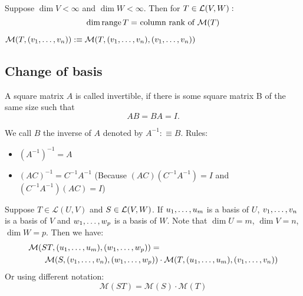   \setcounter{thm}{77}
  \begin{thm} 
    Suppose $\dim V < \infty$ and $\dim W < \infty$. Then for $T \in \mathcal{L}(V,W):$
    \begin{equation}
      \dim \myrange T = $ column rank of $ \mmatrix (T)
    \end{equation}
  \begin{mydef-non}
  $\mathcal{M}(T, (v_1, \dots, v_n)) :\equiv \mathcal{M}(T, (v_1, \dots, v_n),(v_1, \dots, v_n))$
\end{mydef-non}
  \end{thm}

  \subsection{Change of basis}


  \setcounter{thm}{79}
  \begin{mydef}
    A square matrix $A$ is called invertible, if there is some square matrix B of the same size such that
    \begin{equation}
    	AB=BA=I.
    \end{equation}

    We call $B$ the inverse of $A$ denoted by $A^{-1} :\equiv B$. Rules:
    \begin{itemize}
      \item $(A^{-1})^{-1}=A$
      \item $(AC)^{-1} = C^{-1}A^{-1}$ (Because $(AC)(C^{-1}A^{-1})=I$ and $(C^{-1}A^{-1})(AC)=I$)
    \end{itemize}
  \end{mydef}

  \begin{thm} 
    Suppose $T\in \mathcal{L}(U,V)$ and $S\in {\mathcal{L}(V,W)}$. If $u_1, \dots, u_m$ is a basis of $U$, $v_1, \dots, v_n$ is a basis of $V$ and $w_1, \dots, w_{p}$ is a basis of $W$. Note that $\dim U = m$, $\dim V = n$, $\dim W = p$. Then we have:
    \begin{equation}
    \begin{aligned}
      &\mathcal{M}(ST, (u_1, \dots, u_m), (w_1, \dots, w_{p})) = \\
      &\qquad \mathcal{M}(S, (v_1, \dots, v_n), (w_1, \dots, w_{p} ))
      \cdot
      \mathcal{M}(T, (u_1, \dots, u_m), (v_1, \dots, v_n   ))
    \end{aligned}
    \end{equation}
    Or using different notation:
    \begin{equation}
      \mathcal{M}(ST) = \mathcal{M}(S) \cdot \mathcal{M}(T)
    \end{equation}
  \end{thm}

